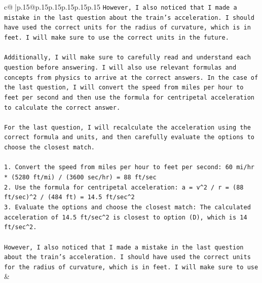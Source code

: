 \documentclass{article}
\begin{document}
{\begin{supertabular}{c@{$\;$}|p{.15\linewidth}@{}p{.15\linewidth}p{.15\linewidth}p{.15\linewidth}p{.15\linewidth}p{.15\linewidth}}
{{{\texttt{However, I also noticed that I made a mistake in the last question about the train's acceleration. I should have used the correct units for the radius of curvature, which is in feet. I will make sure to use the correct units in the future.} \\
\\ 
\texttt{Additionally, I will make sure to carefully read and understand each question before answering. I will also use relevant formulas and concepts from physics to arrive at the correct answers. In the case of the last question, I will convert the speed from miles per hour to feet per second and then use the formula for centripetal acceleration to calculate the correct answer.} \\
\\ 
\texttt{For the last question, I will recalculate the acceleration using the correct formula and units, and then carefully evaluate the options to choose the closest match.} \\
\\ 
\texttt{1. Convert the speed from miles per hour to feet per second: 60 mi/hr * (5280 ft/mi) / (3600 sec/hr) = 88 ft/sec} \\
\texttt{2. Use the formula for centripetal acceleration: a = v\^{}2 / r = (88 ft/sec)\^{}2 / (484 ft) = 14.5 ft/sec\^{}2} \\
\texttt{3. Evaluate the options and choose the closest match: The calculated acceleration of 14.5 ft/sec\^{}2 is closest to option (D), which is 14 ft/sec\^{}2.} \\
\\ 
\texttt{However, I also noticed that I made a mistake in the last question about the train's acceleration. I should have used the correct units for the radius of curvature, which is in feet. I will make sure to use} \\
            }
        }
    }
    & \\ \\

\end{supertabular}
}
\end{document}
